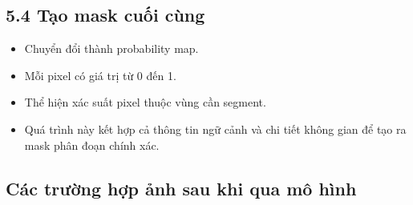 \documentclass[12pt]{report}
\begin{document}
\subsection*{5.4 Tạo mask cuối cùng}
\begin{itemize}
    \item Chuyển đổi thành probability map.
    \item Mỗi pixel có giá trị từ 0 đến 1.
    \item Thể hiện xác suất pixel thuộc vùng cần segment.
    \item Quá trình này kết hợp cả thông tin ngữ cảnh và chi tiết không gian để tạo ra mask phân đoạn chính xác.
\end{itemize}

\subsection*{Các trường hợp ảnh sau khi qua mô hình}
\end{document}
